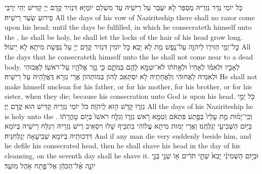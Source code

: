 {כָּל יוֹמֵי נְדַר נִזְרֵיהּ מַסְפַּר לָא יִעְבַּר עַל רֵישֵׁיהּ עַד מִשְׁלַם יוֹמַיָּא דִּנְזִיר קֳדָם יְיָ קַדִּישׁ יְהֵי יְרַבֵּי פֵירוּעַ שְׂעַר רֵישֵׁיהּ׃}
{All the days of his vow of Naziriteship there shall no razor come upon his head; until the days be fulfilled, in which he consecrateth himself unto the \lord, he shall be holy, he shall let the locks of the hair of his head grow long.}{}
{כׇּל־יְמֵ֥י הַזִּיר֖וֹ לַיהֹוָ֑ה עַל־נֶ֥פֶשׁ מֵ֖ת לֹ֥א יָבֹֽא׃}
{כָּל יוֹמִין דִּנְזִיר קֳדָם יְיָ עַל נַפְשָׁת מִיתָא לָא יֵיעוֹל׃}
{All the days that he consecrateth himself unto the \lord\space he shall not come near to a dead body.}{}
{לְאָבִ֣יו וּלְאִמּ֗וֹ לְאָחִיו֙ וּלְאַ֣חֹת֔וֹ לֹא־יִטַּמָּ֥א לָהֶ֖ם בְּמֹתָ֑ם כִּ֛י נֵ֥זֶר אֱלֹהָ֖יו עַל־רֹאשֽׁוֹ׃}
{לַאֲבוּהִי וּלְאִמֵּיהּ לַאֲחוּהִי וְלַאֲחָתֵיהּ לָא יִסְתָּאַב לְהוֹן בְּמוֹתְהוֹן אֲרֵי נִזְרָא דֶּאֱלָהֵיהּ עַל רֵישֵׁיהּ׃}
{He shall not make himself unclean for his father, or for his mother, for his brother, or for his sister, when they die; because his consecration unto God is upon his head.}{}
{כֹּ֖ל יְמֵ֣י נִזְר֑וֹ קָדֹ֥שׁ ה֖וּא לַֽיהֹוָֽה׃
}
{כֹּל יוֹמֵי נִזְרֵיהּ קַדִּישׁ הוּא קֳדָם יְיָ׃}
{All the days of his Naziriteship he is holy unto the \lord.}{}
{וְכִֽי־יָמ֨וּת מֵ֤ת עָלָיו֙ בְּפֶ֣תַע פִּתְאֹ֔ם וְטִמֵּ֖א רֹ֣אשׁ נִזְר֑וֹ וְגִלַּ֤ח רֹאשׁוֹ֙ בְּי֣וֹם טׇהֳרָת֔וֹ בַּיּ֥וֹם הַשְּׁבִיעִ֖י יְגַלְּחֶֽנּוּ׃
}
{וַאֲרֵי יְמוּת מִיתָא עֲלוֹהִי בִּתְכֵּיף שָׁלוּ וִיסַאֵיב רֵישׁ נִזְרֵיהּ וִיגַלַּח רֵישֵׁיהּ בְּיוֹמָא דִּדְכוּתֵיהּ בְּיוֹמָא שְׁבִיעָאָה יְגַלְּחִנֵּיהּ׃}
{And if any man die very suddenly beside him, and he defile his consecrated head, then he shall shave his head in the day of his cleansing, on the seventh day shall he shave it.}{}
{וּבַיּ֣וֹם הַשְּׁמִינִ֗י יָבִא֙ שְׁתֵּ֣י תֹרִ֔ים א֥וֹ שְׁנֵ֖י בְּנֵ֣י יוֹנָ֑ה אֶ֨ל־הַכֹּהֵ֔ן אֶל־פֶּ֖תַח אֹ֥הֶל מוֹעֵֽד׃
}
